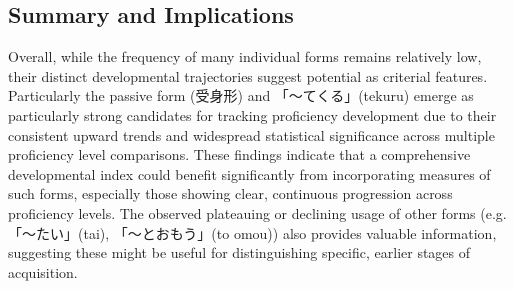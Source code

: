 \subsection{Summary and Implications}
Overall, while the frequency of many individual forms remains relatively low, their distinct developmental trajectories
suggest potential as
criterial features. Particularly the passive form (受身形) and 「〜てくる」(tekuru) emerge as particularly strong candidates
for tracking proficiency development due to their consistent upward trends and widespread statistical significance
across multiple proficiency level comparisons. These findings indicate that a comprehensive developmental index
could benefit significantly from incorporating measures of such forms, especially those showing clear, continuous
progression across proficiency levels. The observed plateauing or declining usage of other forms (e.g. 「〜たい」(tai),
「〜とおもう」(to omou)) also provides valuable information, suggesting these might be useful for distinguishing specific,
earlier stages of acquisition.